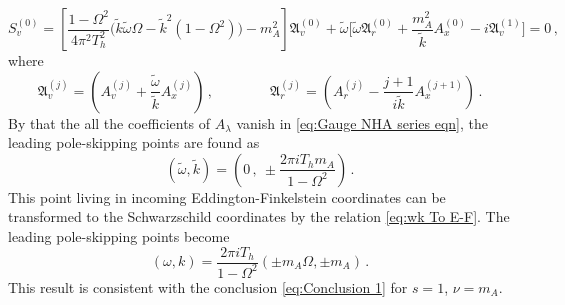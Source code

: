 \documentclass[11pt,a4paper]{article}
\begin{document}
\begin{equation} \label{eq:Gauge NHA series eqn}
    S_v^{(0)} =
    \left[\frac{ 1 - \Omega^2 }{4 \pi^2 T_h^2} \bigg( \tilde{k} \tilde{\omega} \Omega - \tilde{k}^2 \left( 1-\Omega ^2 \right) \bigg) - m_A^2\right] \mathfrak{A}_v^{(0)}
    + \tilde{\omega} \bigg[ \tilde{\omega} \mathfrak{A}_r^{(0)}
    + \frac{m_A^2}{\tilde{k}} A_x^{(0)}
    - i \mathfrak{A}_v^{(1)} \bigg]
    = 0 \,,
\end{equation}
where
\begin{equation}
    \mathfrak{A}_v^{(j)}=\left(A_v^{(j)} + \frac{\tilde{\omega}}{\tilde{k}} A_x^{(j)} \right)\,, \qquad \qquad
    \mathfrak{A}_r^{(j)}=\left(A_r^{(j)} - \frac{j+1}{i\tilde{k}} A_x^{(j+1)} \right)\,.
\end{equation}
By that the all the coefficients of $A_{\lambda}$ vanish in \eqref{eq:Gauge NHA series eqn}, the leading pole-skipping points are found as
\begin{equation}
    (\tilde{\omega}, \tilde{k}) = \left(0\,, ~ \pm \frac{2 \pi i T_h m_A}{1 - \Omega^2} \right)\,.
\end{equation}
This point living in incoming Eddington-Finkelstein coordinates can be transformed to the Schwarzschild coordinates by the relation \eqref{eq:wk To E-F}. The leading pole-skipping points become
\begin{equation}
    (\omega, k) = \frac{2\pi i T_h}{1-\Omega^2}\left(\pm m_A \Omega, \pm m_A \right)\,.
\end{equation}
This result is consistent with the conclusion \eqref{eq:Conclusion 1} for $s=1$, $\nu=m_A$.
\end{document}
